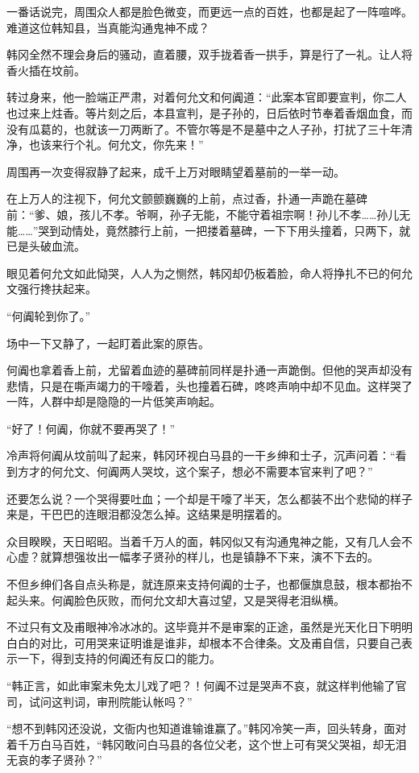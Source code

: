一番话说完，周围众人都是脸色微变，而更远一点的百姓，也都是起了一阵喧哗。难道这位韩知县，当真能沟通鬼神不成？

韩冈全然不理会身后的骚动，直着腰，双手拢着香一拱手，算是行了一礼。让人将香火插在坟前。

转过身来，他一脸端正严肃，对着何允文和何阗道：“此案本官即要宣判，你二人也过来上炷香。等片刻之后，本县宣判，是子孙的，日后依时节奉着香烟血食，而没有瓜葛的，也就该一刀两断了。不管尔等是不是墓中之人子孙，打扰了三十年清净，也该来行个礼。何允文，你先来！”

周围再一次变得寂静了起来，成千上万对眼睛望着墓前的一举一动。

在上万人的注视下，何允文颤颤巍巍的上前，点过香，扑通一声跪在墓碑前：“爹、娘，孩儿不孝。爷啊，孙子无能，不能守着祖宗啊！孙儿不孝……孙儿无能……”哭到动情处，竟然膝行上前，一把搂着墓碑，一下下用头撞着，只两下，就已是头破血流。

眼见着何允文如此恸哭，人人为之恻然，韩冈却仍板着脸，命人将挣扎不已的何允文强行搀扶起来。

“何阗轮到你了。”

场中一下又静了，一起盯着此案的原告。

何阗也拿着香上前，尤留着血迹的墓碑前同样是扑通一声跪倒。但他的哭声却没有悲情，只是在嘶声竭力的干嚎着，头也撞着石碑，咚咚声响中却不见血。这样哭了一阵，人群中却是隐隐的一片低笑声响起。

“好了！何阗，你就不要再哭了！”

冷声将何阗从坟前叫了起来，韩冈环视白马县的一干乡绅和士子，沉声问着：“看到方才的何允文、何阗两人哭坟，这个案子，想必不需要本官来判了吧？”

还要怎么说？一个哭得要吐血；一个却是干嚎了半天，怎么都装不出个悲恸的样子来是，干巴巴的连眼泪都没怎么掉。这结果是明摆着的。

众目睽睽，天日昭昭。当着千万人的面，韩冈似又有沟通鬼神之能，又有几人会不心虚？就算想强妆出一幅孝子贤孙的样儿，也是镇静不下来，演不下去的。

不但乡绅们各自点头称是，就连原来支持何阗的士子，也都偃旗息鼓，根本都抬不起头来。何阗脸色灰败，而何允文却大喜过望，又是哭得老泪纵横。

不过只有文及甫眼神冷冰冰的。这毕竟并不是审案的正途，虽然是光天化日下明明白白的对比，可用哭来证明谁是谁非，却根本不合律条。文及甫自信，只要自己表示一下，得到支持的何阗还有反口的能力。

“韩正言，如此审案未免太儿戏了吧？！何阗不过是哭声不哀，就这样判他输了官司，试问这判词，审刑院能认帐吗？”

“想不到韩冈还没说，文衙内也知道谁输谁赢了。”韩冈冷笑一声，回头转身，面对着千万白马百姓，“韩冈敢问白马县的各位父老，这个世上可有哭父哭祖，却无泪无哀的孝子贤孙？”

